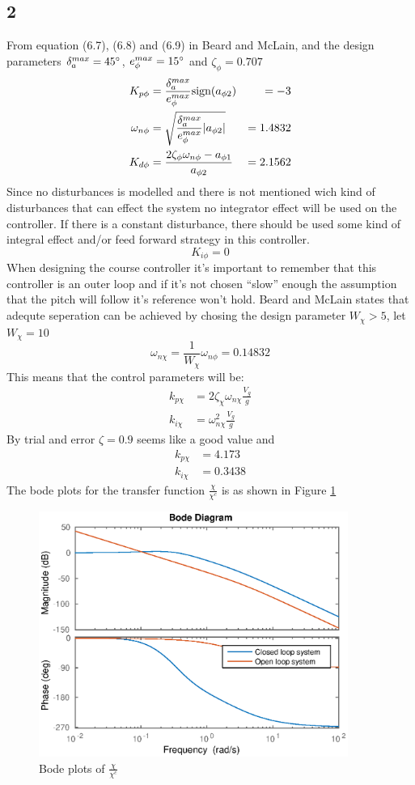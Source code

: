 \documentclass[11pt]{article}
\begin{document}
\subsection*{2}
From equation (6.7), (6.8) and (6.9) in Beard and McLain, and the design parameters $\delta^{max}_a = 45 \degree$, $e^{max}_{\phi} = 15 \degree$ and $\zeta_{\phi} = 0.707$
\begin{align*}
K_{p \phi} &= \frac{\delta^{max}_a}{e^{max}_{\phi}} \hbox{sign}(a_{\phi 2}) &= -3  \\
\omega_{n \phi} &= \sqrt{\frac{\delta^{max}_a}{e^{max}_{\phi}} |a_{\phi 2}| } &= 1.4832 \\
K_{d \phi} &= \frac{2 \zeta_{\phi} \omega_{n \phi} - a_{\phi 1} }{ a_{\phi 2} } &= 2.1562
\end{align*}
Since no disturbances is modelled and there is not mentioned wich kind of disturbances that can effect the system no integrator effect will be used on the controller. If there is a constant disturbance, there should be used some kind of integral effect and/or feed forward strategy in this controller.
\[K_{i \phi} = 0\]
When designing the course controller it's important to remember that this controller is an outer loop and if it's not chosen ``slow'' enough the assumption that the pitch will follow it's reference won't hold. Beard and McLain states that adequte seperation can be achieved by chosing the design parameter $W_{\chi} > 5$, let $W_{\chi} = 10$
\[\omega_{n \chi} = \frac{1}{W_{\chi}} \omega_{n \phi} = 0.14832\]
This means that the control parameters will be:
\begin{align*}
k_{p \chi} &= 2 \zeta_{\chi} \omega_{n \chi} \frac{V_g}{g} \\
k_{i \chi} &= \omega_{n \chi}^2 \frac{V_g}{g}
\end{align*}
By trial and error $\zeta = 0.9$ seems like a good value and
\begin{align*}
k_{p \chi} &= 4.173 \\
k_{i \chi} &= 0.3438
\end{align*}
The bode plots for the transfer function $\frac{\chi}{\chi^c}$ is as shown in Figure \ref{fig:22}

\begin{figure} 
\centering
\includegraphics[width=0.9\textwidth]{fig22.eps}
\caption{Bode plots of $\frac{\chi}{\chi^c}$}
\label{fig:22}
\end{figure}
\end{document}
